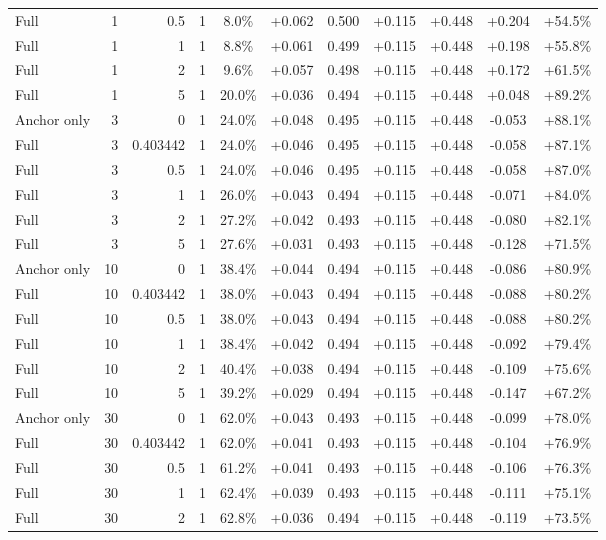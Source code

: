 \begin{table}[htbp]
\begin{tabular}{lrrrccccccc}
Full & 1 & 0.5 & 1 & 8.0\% & +0.062 & 0.500 & +0.115 & +0.448 & +0.204 & +54.5\% \\
Full & 1 & 1 & 1 & 8.8\% & +0.061 & 0.499 & +0.115 & +0.448 & +0.198 & +55.8\% \\
Full & 1 & 2 & 1 & 9.6\% & +0.057 & 0.498 & +0.115 & +0.448 & +0.172 & +61.5\% \\
Full & 1 & 5 & 1 & 20.0\% & +0.036 & 0.494 & +0.115 & +0.448 & +0.048 & +89.2\% \\
Anchor only & 3 & 0 & 1 & 24.0\% & +0.048 & 0.495 & +0.115 & +0.448 & -0.053 & +88.1\% \\
Full & 3 & 0.403442 & 1 & 24.0\% & +0.046 & 0.495 & +0.115 & +0.448 & -0.058 & +87.1\% \\
Full & 3 & 0.5 & 1 & 24.0\% & +0.046 & 0.495 & +0.115 & +0.448 & -0.058 & +87.0\% \\
Full & 3 & 1 & 1 & 26.0\% & +0.043 & 0.494 & +0.115 & +0.448 & -0.071 & +84.0\% \\
Full & 3 & 2 & 1 & 27.2\% & +0.042 & 0.493 & +0.115 & +0.448 & -0.080 & +82.1\% \\
Full & 3 & 5 & 1 & 27.6\% & +0.031 & 0.493 & +0.115 & +0.448 & -0.128 & +71.5\% \\
Anchor only & 10 & 0 & 1 & 38.4\% & +0.044 & 0.494 & +0.115 & +0.448 & -0.086 & +80.9\% \\
Full & 10 & 0.403442 & 1 & 38.0\% & +0.043 & 0.494 & +0.115 & +0.448 & -0.088 & +80.2\% \\
Full & 10 & 0.5 & 1 & 38.0\% & +0.043 & 0.494 & +0.115 & +0.448 & -0.088 & +80.2\% \\
Full & 10 & 1 & 1 & 38.4\% & +0.042 & 0.494 & +0.115 & +0.448 & -0.092 & +79.4\% \\
Full & 10 & 2 & 1 & 40.4\% & +0.038 & 0.494 & +0.115 & +0.448 & -0.109 & +75.6\% \\
Full & 10 & 5 & 1 & 39.2\% & +0.029 & 0.494 & +0.115 & +0.448 & -0.147 & +67.2\% \\
Anchor only & 30 & 0 & 1 & 62.0\% & +0.043 & 0.493 & +0.115 & +0.448 & -0.099 & +78.0\% \\
Full & 30 & 0.403442 & 1 & 62.0\% & +0.041 & 0.493 & +0.115 & +0.448 & -0.104 & +76.9\% \\
Full & 30 & 0.5 & 1 & 61.2\% & +0.041 & 0.493 & +0.115 & +0.448 & -0.106 & +76.3\% \\
Full & 30 & 1 & 1 & 62.4\% & +0.039 & 0.493 & +0.115 & +0.448 & -0.111 & +75.1\% \\
Full & 30 & 2 & 1 & 62.8\% & +0.036 & 0.494 & +0.115 & +0.448 & -0.119 & +73.5\% \\

\end{tabular}
\end{table}
